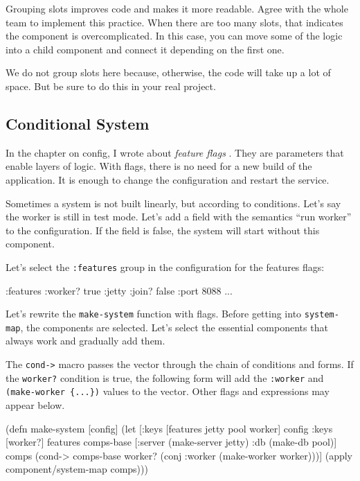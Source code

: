 Grouping slots improves code and makes it more readable. Agree with the whole team to implement this practice. When there are too many slots, that indicates the component is overcomplicated. In this case, you can move some of the logic into a child component and connect it depending on the first one.

We do not group slots here because, otherwise, the code will take up a lot of space. But be sure to do this in your real project.

\subsection{Conditional System}


In the chapter on config, I wrote about \emph{feature flags} . They are parameters that enable layers of logic. With flags, there is no need for a new build of the application. It is enough to change the configuration and restart the service.

Sometimes a system is not built linearly, but according to conditions. Let's say the worker is still in test mode. Let's add a field with the semantics ``run worker'' to the configuration. If the field is false, the system will start without this component.


Let's select the \verb|:features| group in the configuration for the features flags:

\begin{english}
  \begin{clojure}
{:features {:worker? true}
 :jetty {:join? false :port 8088}
 ...}
  \end{clojure}
\end{english}

Let's rewrite the \verb|make-system| function with flags. Before getting into \verb|system-map|, the components are selected. Let's select the essential components that always work and gradually add them.

The \verb|cond->| macro passes the vector through the chain of conditions and forms. If the \verb|worker?| condition is true, the following form will add the \verb|:worker| and \verb| (make-worker {...})| values to the vector. Other flags and expressions may appear below.

\ifnarrow

\begin{english}
  \begin{clojure}
(defn make-system [config]
  (let [{:keys [features jetty
                pool worker]} config
        {:keys [worker?]} features
        comps-base [:server
                    (make-server jetty)
                    :db (make-db pool)]
        comps (cond-> comps-base
                worker?
                (conj :worker
                  (make-worker worker)))]
    (apply component/system-map comps)))
  \end{clojure}
\end{english}

